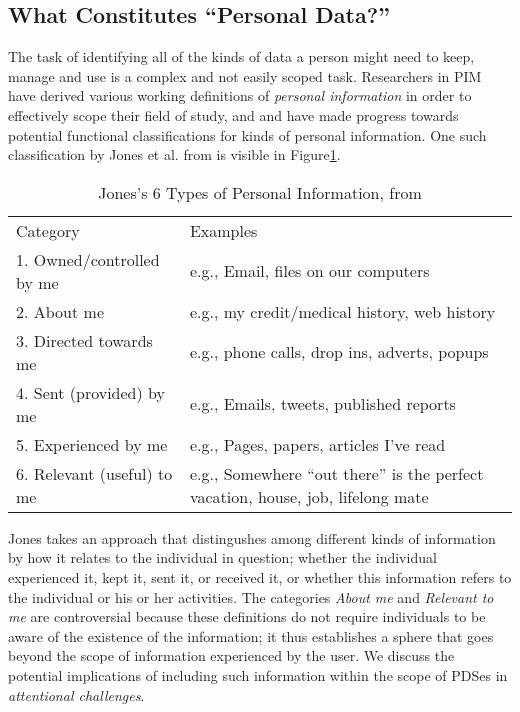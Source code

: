 \documentclass[runningheads,a4paper]{llncs}
\begin{document}
\subsection{What Constitutes ``Personal Data?''}

The task of identifying all of the kinds of data a person might need to keep, manage and use is a complex and not easily scoped task.  Researchers in PIM have derived various working definitions of \emph{personal information} in order to effectively scope their field of study, and and have made progress towards potential functional classifications for kinds of personal information. One such classification by Jones et al. from \cite{kftf} is visible in Figure\ref{fig:jonestype}.

\begin{table}
\begin{tabular}{p{4cm} p{8cm}} 
Category & Examples \\
1. Owned/controlled by me & e.g., Email, files on our computers  \\
2. About me	& e.g., my credit/medical history, web history \\
3. Directed towards me & e.g., phone calls, drop ins, adverts, popups \\
4. Sent (provided) by me & e.g.,  Emails, tweets, published reports  \\
5. Experienced by me & e.g.,  Pages, papers, articles I’ve read \\
6. Relevant (useful) to me	& e.g.,  Somewhere ``out there'' is the perfect vacation, house, job, lifelong mate \\
\end{tabular}
\caption{Jones's 6 Types of Personal Information, from \cite{kftf}}
\label{fig:jonestype}
\end{table}

Jones takes an approach that distingushes among different kinds of information by how it relates to the individual in question; whether the individual experienced it, kept it, sent it, or received it, or whether this information refers to the individual or his or her activities.  The categories \emph{About me} and \emph{Relevant to me} are controversial because these definitions do not require individuals to be aware of the existence of the information; it thus establishes a sphere that goes beyond the scope of information experienced by the user.  We discuss the potential implications of including such information within the scope of PDSes in \emph{attentional challenges}. 
\end{document}
